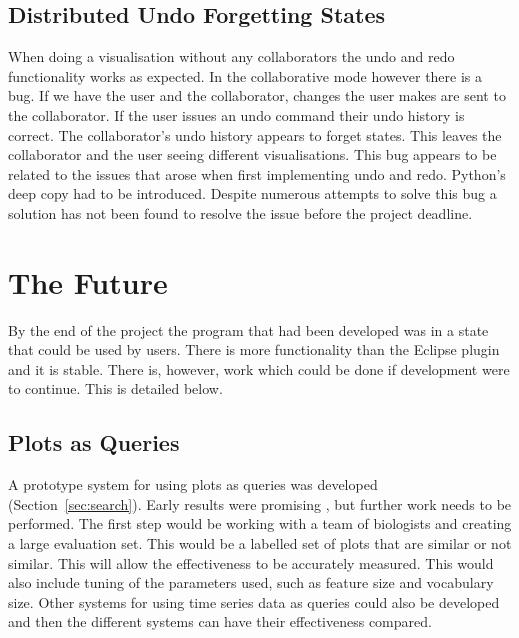 \subsection{Distributed Undo Forgetting States}

When doing a visualisation without any collaborators the undo and redo functionality works as expected.  In the collaborative mode however there is a bug.  If we have the user and the collaborator, changes the user makes are sent to the collaborator.  If the user issues an undo command their undo history is correct.  The collaborator's undo history appears to forget states.  This leaves the collaborator and the user seeing different visualisations.  This bug appears to be related to the issues that arose when first implementing undo and redo. Python's deep copy had to be introduced.  Despite numerous attempts to solve this bug a solution has not been found to resolve the issue before the project deadline.

\section{The Future}

By the end of the project the program that had been developed was in a state that could be used by users.  There is more functionality than the Eclipse plugin and it is stable.  There is, however, work which could be done if development were to continue.  This is detailed below.

\subsection{Plots as Queries}
A prototype system for using plots as queries was developed (Section~\ref{sec:search}).  Early results were promising , but further work needs to be performed.  The first step would be working with a team of biologists and creating a large evaluation set. This would be a labelled set of plots that are similar or not similar.  This will allow the effectiveness to be accurately measured.  This would also include tuning of the parameters used, such as feature size and vocabulary size.  Other systems for using time series data as queries could also be developed and then the different systems can have their effectiveness compared.

